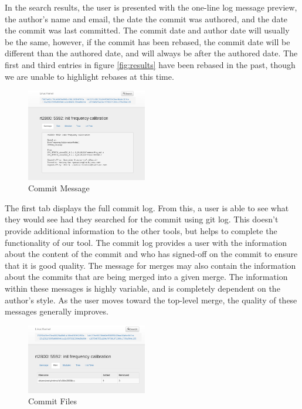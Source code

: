 \documentclass[conference, draftclsnofoot]{IEEEtran}
\begin{document}
In the search results, the user is presented with the one-line log message
preview, the author's name and email, the date the commit was authored, and the
date the commit was last committed.  The commit date and author date will
usually be the same, however, if the commit has been rebased, the commit date
will be different than the authored date, and will always be after the authored
date. The first and third entries in figure \ref{fig:results} have been rebased
in the past, though we are unable to highlight rebases at this time.

\begin{figure}[h]
        \centering
        \includegraphics[width=0.47\textwidth]{figures/message_view.png}
        \caption{Commit Message}
        \label{fig:message}
\end{figure}

The first tab displays the full commit log. From this, a user is able to see
what they would see had they searched for the commit using git log. This
doesn't provide additional information to the other tools, but helps to
complete the functionality of our tool. The commit log provides a user with
the information about the content of the commit and who has signed-off on the
commit to ensure that it is good quality. The message for merges may also
contain the information about the commits that are being merged into a given
merge. The information within these messages is highly variable, and is
completely dependent on the author's style. As the user moves toward the
top-level merge, the quality of these messages generally improves.

\begin{figure}[h]
        \centering
        \includegraphics[width=0.47\textwidth]{figures/file_view.png}
        \caption{Commit Files}
        \label{fig:files}
\end{figure}
\end{document}

